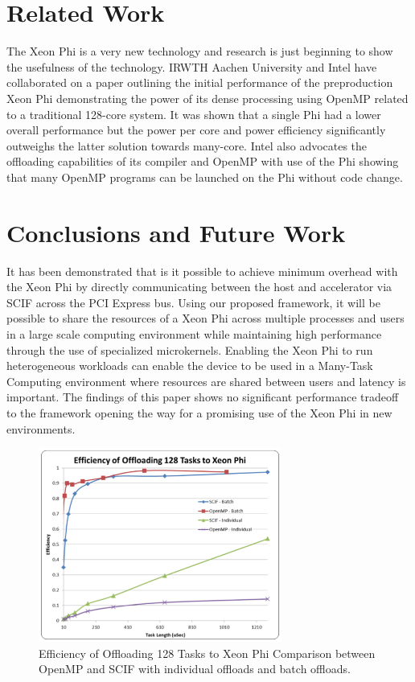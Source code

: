 \documentclass[conference]{IEEEtran}
\begin{document}
\section{Related Work}
The Xeon Phi is a very new technology and research is just beginning to show the usefulness of the technology. IRWTH Aachen University and Intel have collaborated on a paper outlining the initial performance of the preproduction Xeon Phi demonstrating the power of its dense processing using OpenMP related to a traditional 128-core system. It was shown that a single Phi had a lower overall performance but the power per core and power efficiency significantly outweighs the latter solution towards many-core. Intel also advocates the offloading capabilities of its compiler and OpenMP with use of the Phi showing that many OpenMP programs can be launched on the Phi without code change.

\section{Conclusions and Future Work}
It has been demonstrated that is it possible to achieve minimum overhead with the Xeon Phi by directly communicating between the host and accelerator via SCIF across the PCI Express bus. Using our proposed framework, it will be possible to share the resources of a Xeon Phi across multiple processes and users in a large scale computing environment while maintaining high performance through the use of specialized microkernels. Enabling the Xeon Phi to run heterogeneous workloads can enable the device to be used in a Many-Task Computing \cite{raicu2008toward} environment where resources are shared between users and latency is important. The findings of this paper shows no significant performance tradeoff to the framework opening the way for a promising use of the Xeon Phi in new environments.

\begin{figure}[h]
\centering\includegraphics[width=8cm]{imgs/sleep_phi.png}
\caption{Efficiency of Offloading 128 Tasks to Xeon Phi Comparison between OpenMP and SCIF with individual offloads and batch offloads.}
\label{fig:sleep_phi}
\end{figure}



\end{document}
